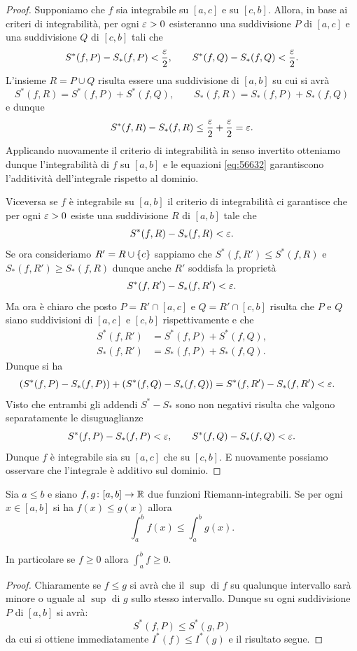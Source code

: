 \begin{proof}
\mymark{*}
Supponiamo che $f$ sia integrabile su $[a,c]$ e su $[c,b]$.
Allora, in base ai criteri di integrabilità, per ogni $\varepsilon>0$ esisteranno una
suddivisione $P$ di $[a,c]$ e una suddivisione $Q$ di $[c,b]$ tali che
\[
  S^*(f,P) - S_*(f,P) < \frac {\varepsilon} 2,
  \qquad
  S^*(f,Q) - S_*(f,Q) < \frac {\varepsilon} 2.
\]
L'insieme $R=P\cup Q$ risulta essere una suddivisione di $[a,b]$ su cui si avrà
\begin{equation}\label{eq:56632}
S^*(f,R) = S^*(f,P) + S^*(f,Q), \qquad
S_*(f,R) = S_*(f,P) + S_*(f,Q)
\end{equation}
e dunque
\[
S^*(f,R) - S_*(f,R) \le \frac {\varepsilon} 2 + \frac {\varepsilon} 2 = \varepsilon.
\]
Applicando nuovamente il criterio di integrabilità in senso invertito otteniamo
dunque l'integrabilità di $f$ su $[a,b]$ e le equazioni
\eqref{eq:56632} garantiscono l'additività dell'integrale rispetto al dominio.

Viceversa se $f$ è integrabile su $[a,b]$ il criterio di integrabilità
ci garantisce che per ogni $\varepsilon>0$ esiste una suddivisione $R$ di $[a,b]$ tale che
\[
S^*(f,R) - S_*(f,R) < \varepsilon.
\]
Se ora consideriamo $R' = R \cup {\left\{ c \right\}}$ sappiamo che $S^*(f,R') \le S^*(f,R)$
e $S_*(f,R') \ge S_*(f,R)$ dunque anche $R'$ soddisfa la proprietà
\[
S^*(f,R') - S_*(f,R') < \varepsilon.
\]
Ma ora è chiaro che posto $P=R'\cap[a,c]$ e $Q=R'\cap[c,b]$ risulta che $P$
e $Q$ siano suddivisioni di $[a,c]$ e $[c,b]$ rispettivamente e che
\begin{align*}
  S^*(f,R') &= S^*(f,P) + S^*(f,Q), \\
  S_*(f,R') &= S_*(f,P) + S_*(f,Q).
\end{align*}
Dunque si ha
\begin{align*}
(S^*(f,P) - S_*(f,P)) + (S^*(f,Q) - S_*(f,Q))
&= S^*(f,R') - S_*(f,R')
< \varepsilon.
\end{align*}
Visto che entrambi gli addendi $S^*-S_*$ sono non negativi
risulta che valgono separatamente le disuguaglianze
\[
S^*(f,P) - S_*(f,P) < \varepsilon, \qquad
S^*(f,Q) - S_*(f,Q) < \varepsilon.
\]
Dunque $f$ è integrabile sia su $[a,c]$ che su $[c,b]$.
E nuovamente possiamo osservare che l'integrale è additivo sul dominio.
\end{proof}  

\begin{theorem}%
\label{th:monotonia_integrale}%
\mymark{*}%
Sia $a\le b$ e siano
$f,g\colon [a,b]\to {\mathbb R}$ due funzioni Riemann-integrabili.
Se per ogni $x\in [a,b]$ si ha $f(x) \le g(x)$ allora
\[
  \int_a^b f(x) \le \int_a^b g(x).
\]

In particolare se $f\ge 0$ allora $\int_a^b f \ge 0$.
\end{theorem}
%
\begin{proof}
Chiaramente se $f \le g$ si avrà che il $\sup$ di $f$ su qualunque intervallo sarà minore o uguale al $\sup$ di $g$ sullo stesso intervallo. Dunque su ogni suddivisione $P$ di $[a,b]$ si avrà:
\[
  S^*(f,P) \le S^*(g,P)
\]
da cui si ottiene immediatamente $I^*(f) \le I^*(g)$ e il risultato segue.
\end{proof}

